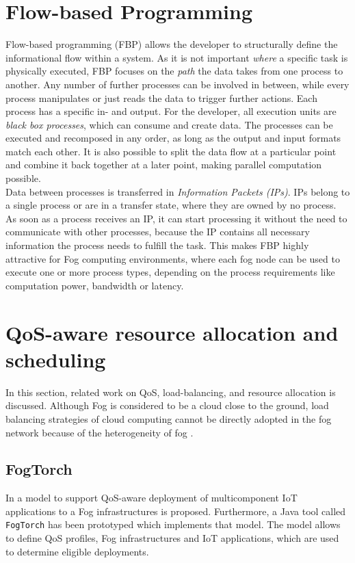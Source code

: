 \section{Flow-based Programming}
Flow-based programming (FBP) allows the developer to structurally define the informational flow within a system.
As it is not important \textit{where} a specific task is physically executed, FBP focuses on the \textit{path} the data takes from one process to another.
Any number of further processes can be involved in between, while every process manipulates or just reads the data to trigger further actions. Each process has a specific in- and output.
For the developer, all execution units are \textit{black box processes}, which can consume and create data.
The processes can be executed and recomposed in any order, as long as the output and input formats match each other.
It is also possible to split the data flow at a particular point and combine it back together at a later point, making parallel computation possible.\\

Data between processes is transferred in \textit{Information Packets (IPs)}.
IPs belong to a single process or are in a transfer state, where they are owned by no process.
As soon as a process receives an IP, it can start processing it without the need to communicate with other processes, because the IP contains all necessary information the process needs to fulfill the task.
This makes FBP highly attractive for Fog computing environments, where each fog node can be used to execute one or more process types, depending on the process requirements like computation power, bandwidth or latency.

\section{QoS-aware resource allocation and scheduling}
In this section, related work on QoS, load-balancing, and resource allocation is discussed. Although Fog is considered to be a cloud close to the ground, load balancing strategies of cloud computing cannot be directly adopted in the fog network because of the heterogeneity of fog \cite{novel-load-balancing}.

\subsection{FogTorch}
In \cite{fogtorch} a model to support QoS-aware deployment of multicomponent IoT applications to a Fog infrastructures is proposed. Furthermore, a Java tool called \texttt{FogTorch} has been prototyped which implements that model. The model allows to define QoS profiles, Fog infrastructures and IoT applications, which are used to determine eligible deployments.\\

